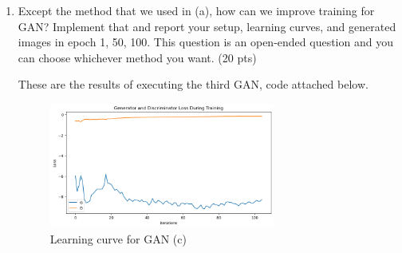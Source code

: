 \documentclass[a4paper]{article}
\theoremstyle{definition}
\newenvironment{soln}{
	\leavevmode\color{blue}\ignorespaces
}{}
\begin{document}
\begin{enumerate} [label=(\alph*)]
\begin{soln}
		Conversely, when using SGD, the images generated did not exhibit the same level of progression and remained less distinct. This can be attributed to the constant learning rate of SGD, which does not account for the nuanced needs of the generator's training process. The learning curve with SGD also showed greater fluctuations in the generator's loss, indicating challenges in optimizing the model effectively.\\
		
		These observations suggest that the adaptive qualities of Adam are better suited for the intricate dynamics of training GANs, a hypothesis that is supported by the more stable and successful learning trajectory observed when Adam is employed.
		\end{soln}
	
		\item Except the method that we used in (a), how can we improve training for GAN? Implement that and report your setup, learning curves, and generated images in epoch 1, 50, 100.
        This question is an open-ended question and you can choose whichever method you want.
		\hfill (20 pts)
		
		\begin{soln}
			These are the results of executing the third GAN, code attached below.
			\begin{figure}[H]
				\centering
				\includegraphics[width=0.7\textwidth]{3-LearningCurve.png}
				\caption{Learning curve for GAN (c)}
				\label{fig:loss_3}
			\end{figure}
			

\end{soln}
\end{enumerate}
\end{document}
